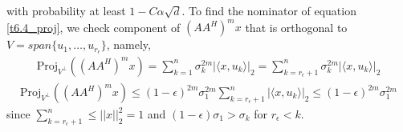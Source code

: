 \documentclass[a4paper, english, headtopline=0.08em, headsepline=0.04em, left = 1cm, right = 1cm, DIV=15]{article}
\begin{document}
with probability at least $1-C\alpha\sqrt{d}$. To find the nominator of equation \ref{t6.4_proj}, 
we check component of $(AA^H)^m x$ that is orthogonal to $V = span\{u_1,\dots,u_{r_\epsilon}\}$, namely,
\begin{align} \label{t6.4_nom}
	\text{Proj}_{V^{\bot}}\left( \left( AA^H\right)^m x \right) = \sum_{k=1}^n \sigma_k^{2m} |\langle x, u_k \rangle|_2=\sum_{k=r_\epsilon + 1}^n \sigma_k^{2m} |\langle x, u_k \rangle|_2 
\end{align} 
\begin{align} \label{t6.4_nom_bound}
	\text{Proj}_{V^{\bot}}\left( \left( AA^H\right)^m x \right) 
	\leq (1-\epsilon)^{2m} \sigma_1^{2m} \sum_{k=r_\epsilon + 1}^n |\langle x, u_k\rangle|_2 \leq (1-\epsilon)^{2m} \sigma_1^{2m}	
\end{align}
since $\sum_{k=r_\epsilon + 1}^n \leq ||x||_2^2 = 1$ and $(1-\epsilon)\sigma_1>\sigma_k$ for $r_{\epsilon}<k$.
\end{document}
